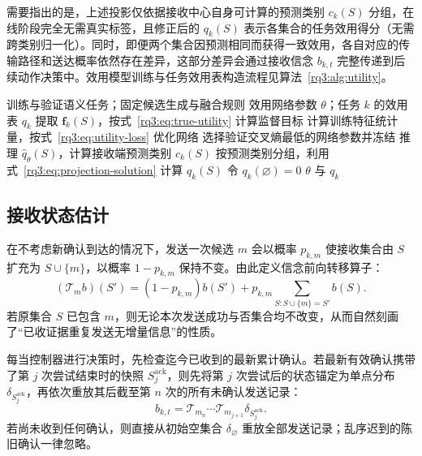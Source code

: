 需要指出的是，上述投影仅依据接收中心自身可计算的预测类别 $c_k(S)$ 分组，在线阶段完全无需真实标签，且修正后的 $q_k(S)$ 表示各集合的任务效用得分（无需跨类别归一化）。同时，即便两个集合因预测相同而获得一致效用，各自对应的传输路径和送达概率依然存在差异，这部分差异会通过接收信念 $b_{k,t}$ 完整传递到后续动作决策中。效用模型训练与任务效用表构造流程见算法~\ref{rq3:alg:utility}。

\begin{algorithm}[H]
  \label{rq3:alg:utility}
  \small
  \begin{algorithmic}[1]
    \Require 训练与验证语义任务；固定候选生成与融合规则
    \Ensure 效用网络参数 $\theta$；任务 $k$ 的效用表 $q_k$
      \State 提取 $\bm f_k(S)$，按式~\eqref{rq3:eq:true-utility} 计算监督目标
    \EndFor
    \State 计算训练特征统计量，按式~\eqref{rq3:eq:utility-loss} 优化网络
    \State 选择验证交叉熵最低的网络参数并冻结
      \State 推理 $\hat q_\theta(S)$，计算接收端预测类别 $c_k(S)$
    \EndFor
    \State 按预测类别分组，利用式~\eqref{rq3:eq:projection-solution} 计算 $q_k(S)$
    \State 令 $q_k(\varnothing)=0$
    \State \Return $\theta$ 与 $q_k$
  \end{algorithmic}
\end{algorithm}

\subsection{接收状态估计}
\label{rq3:subsec:filter}

在不考虑新确认到达的情况下，发送一次候选 $m$ 会以概率 $p_{k,m}$ 使接收集合由 $S$ 扩充为 $S\cup\{m\}$，以概率 $1-p_{k,m}$ 保持不变。由此定义信念前向转移算子：
\begin{equation}
  (\mathcal T_m b)(S')=(1-p_{k,m})b(S')
   +p_{k,m}\sum_{S:S\cup\{m\}=S'}b(S).
  \label{rq3:eq:belief-transition}
\end{equation}
若原集合 $S$ 已包含 $m$，则无论本次发送成功与否集合均不改变，从而自然刻画了“已收证据重复发送无增量信息”的性质。

每当控制器进行决策时，先检查迄今已收到的最新累计确认。若最新有效确认携带了第 $j$ 次尝试结束时的快照 $S_j^{\mathrm{ack}}$，则先将第 $j$ 次尝试后的状态锚定为单点分布 $\delta_{S_j^{\mathrm{ack}}}$，再依次重放其后截至第 $n$ 次的所有未确认发送记录：
\begin{equation}
  b_{k,t}=\mathcal T_{m_n}\cdots\mathcal T_{m_{j+1}}
          \delta_{S_j^{\mathrm{ack}}}.
  \label{rq3:eq:ack-replay}
\end{equation}
若尚未收到任何确认，则直接从初始空集合 $\delta_{\varnothing}$ 重放全部发送记录；乱序迟到的陈旧确认一律忽略。


